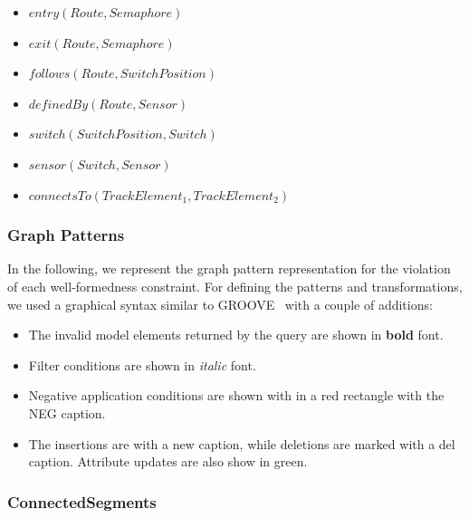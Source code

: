 \begin{itemize}
  \item $ \mathit{entry}\left(\mathit{Route}, \mathit{Semaphore}\right) $
  \item $ \mathit{exit}\left(\mathit{Route}, \mathit{Semaphore}\right) $
  \item $ \mathit{follows}\left(\mathit{Route}, \mathit{SwitchPosition}\right) $
  \item $ \mathit{definedBy}\left(\mathit{Route}, \mathit{Sensor}\right) $
  \item $ \mathit{switch}\left(\mathit{SwitchPosition}, \mathit{Switch}\right) $
  \item $ \mathit{sensor}\left(\mathit{Switch}, \mathit{Sensor}\right) $
  \item $ \mathit{connectsTo}\left(\mathit{TrackElement}_1, \mathit{TrackElement}_2\right) $
\end{itemize}

\subsubsection{Graph Patterns}

In the following, we represent the graph pattern representation for the violation of each well-formedness constraint. For defining the patterns and transformations, we used a graphical syntax similar to GROOVE~\cite{rensink2004groove} with a couple of additions:

\begin{itemize}
  \item The invalid model elements returned by the query are shown in \textbf{bold} font.
  \item Filter conditions are shown in \textit{italic} font.
  \item Negative application conditions are shown with in a \textcolor{negcolor}{red} rectangle with the \textcolor{negcolor}{\textsf{NEG}} caption.
  \item The insertions are with a \textcolor{newcolor}{\guillemotleft{}new\guillemotright{}} caption, while deletions are marked with a \textcolor{delcolor}{\guillemotleft{}del\guillemotright{}} caption. Attribute updates are also show in \textcolor{newcolor}{green}.
\end{itemize}


\subsubsection{ConnectedSegments}

